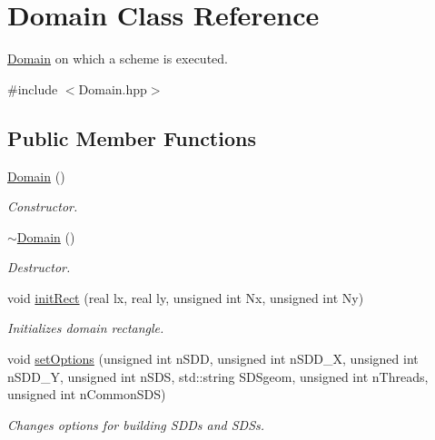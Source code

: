 \hypertarget{classDomain}{}\section{Domain Class Reference}
\label{classDomain}


\mbox{\hyperlink{classDomain}{Domain}} on which a scheme is executed.  




{\ttfamily \#include $<$Domain.\+hpp$>$}

\subsection*{Public Member Functions}
\begin{DoxyCompactItemize}
\item 
\mbox{\label{classDomain_a6adccae537e53d4fde2b70f875e6b8d0}} 
\mbox{\hyperlink{classDomain_a6adccae537e53d4fde2b70f875e6b8d0}{Domain}} ()
\begin{DoxyCompactList}\small\item\em Constructor. \end{DoxyCompactList}\item 
\mbox{\label{classDomain_a29cec9afb2e54c810ba1f3c1a49543a8}} 
\mbox{\hyperlink{classDomain_a29cec9afb2e54c810ba1f3c1a49543a8}{$\sim$\+Domain}} ()
\begin{DoxyCompactList}\small\item\em Destructor. \end{DoxyCompactList}\item 
void \mbox{\hyperlink{classDomain_a853266061b629ff1f920b46c06c478d6}{init\+Rect}} (real lx, real ly, unsigned int Nx, unsigned int Ny)
\begin{DoxyCompactList}\small\item\em Initializes domain rectangle. \end{DoxyCompactList}\item 
void \mbox{\hyperlink{classDomain_ac60a7e32100a8484208d247565dbb879}{set\+Options}} (unsigned int n\+S\+DD, unsigned int n\+S\+D\+D\+\_\+X, unsigned int n\+S\+D\+D\+\_\+Y, unsigned int n\+S\+DS, std\+::string S\+D\+Sgeom, unsigned int n\+Threads, unsigned int n\+Common\+S\+DS)
\begin{DoxyCompactList}\small\item\em Changes options for building S\+D\+Ds and S\+D\+Ss. \end{DoxyCompactList}\item 

\end{DoxyCompactItemize}
